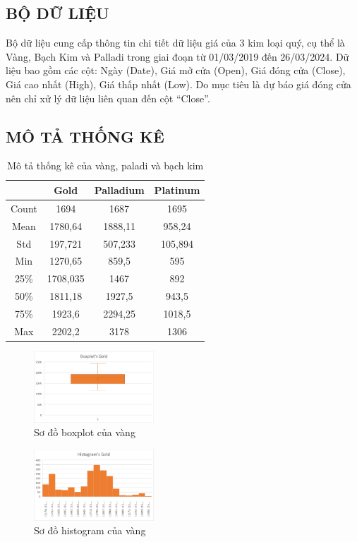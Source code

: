 \subsection{BỘ DỮ LIỆU}
Bộ dữ liệu cung cấp thông tin chi tiết dữ liệu giá của 3 kim loại quý, cụ thể là Vàng, Bạch Kim và Palladi trong giai đoạn từ 01/03/2019 đến 26/03/2024. Dữ liệu bao gồm các cột: Ngày (Date), Giá mở cửa (Open), Giá đóng cửa (Close), Giá cao nhất (High), Giá thấp nhất (Low). Do mục tiêu là dự báo giá đóng cửa nên chỉ xử lý dữ liệu liên quan đến cột “Close”.

\subsection{MÔ TẢ THỐNG KÊ}
\begin{table}[htbp]
  \centering
\begin{tabular}{|c|c|c|c|}
    \hline
     \  & Gold & Palladium & Platinum \\ \hline
     Count & 1694 & 1687& 1695\\ \hline
     Mean & 1780,64 & 1888,11 & 958,24\\ \hline
     Std & 197,721 & 507,233 & 105,894\\ \hline
     Min & 1270,65 & 859,5 & 595\\ \hline
     25\% & 1708,035 & 1467 & 892\\ \hline
     50\% & 1811,18 & 1927,5 & 943,5\\ \hline
     75\% & 1923,6 & 2294,25 & 1018,5\\ \hline
     Max & 2202,2 & 3178 & 1306\\ \hline
\end{tabular}
\caption{Mô tả thống kê của vàng, paladi và bạch kim}
\end{table}

\begin{figure}[htbp]
\centerline{\includegraphics[width=0.4\textwidth]{img/Picture2.png}}
\caption{Sơ đồ boxplot của vàng}
\label{fig}
\end{figure}

\begin{figure}[htbp]
\centerline{\includegraphics[width=0.4\textwidth]{img/Picture5.png}}
\caption{Sơ đồ histogram của vàng}
\label{fig}
\end{figure}

